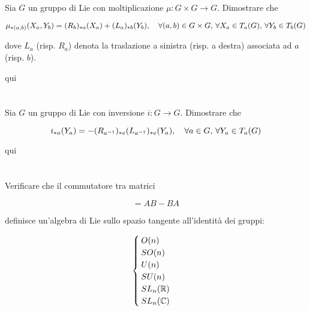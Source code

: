 %

\section{}\label{es3-7}

\begin{tcolorbox}
	Sia $ G $ un gruppo di Lie con moltiplicazione $ \mu : G \times G \to G $. Dimostrare che
	
	\begin{equation}
		\mu_{*(a,b)}(X_{a},Y_{b}) = (R_{b})_{*a}(X_{a}) + (L_{a})_{*b}(Y_{b}) \qcomma \forall (a,b) \in G \times G, \, \forall X_{a} \in T_{a}(G), \, \forall Y_{b} \in T_{b}(G)
	\end{equation}

	dove $ L_{a} $ (risp. $ R_{a} $) denota la traslazione a sinistra (risp. a destra) associata ad $ a $ (risp. $ b $).
\end{tcolorbox}

qui

%

\newpage

%

\section{}\label{es3-8}

\begin{tcolorbox}
		Sia $ G $ un gruppo di Lie con inversione $ i : G \to G $. Dimostrare che
	
	\begin{equation}
		i_{*a}(Y_{a}) = -(R_{a^{-1}})_{*e}(L_{a^{-1}})_{*e} (Y_{a}) \qcomma \forall a \in G, \, \forall Y_{a} \in T_{a}(G)
	\end{equation}
\end{tcolorbox}

qui

%

\newpage

%

\section{}\label{es3-9}

\begin{tcolorbox}
	Verificare che il commutatore tra matrici
	
	\begin{equation}
		[A,B] = AB - BA
	\end{equation}

	definisce un'algebra di Lie sullo spazio tangente all'identità dei gruppi:
	
	\begin{equation}
		\begin{cases}
			O(n)\\
			SO(n)\\
			U(n)\\
			SU(n)\\
			SL_{n}(\mathbb{R})\\
			SL_{n}(\mathbb{C})
		\end{cases}
	\end{equation}
\end{tcolorbox}

